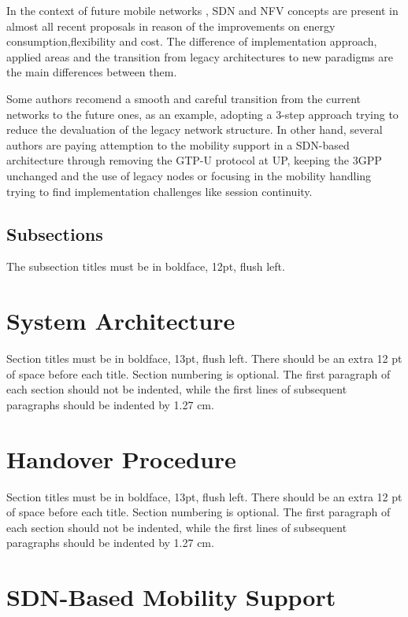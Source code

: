 \documentclass[12pt]{article}
\begin{document}
In the context of future mobile networks , SDN and NFV concepts are present in almost all recent proposals in reason of the improvements on energy consumption,flexibility and cost. The difference of implementation approach, applied areas and the transition from legacy architectures to new paradigms are the main differences between them.

Some authors recomend a smooth and careful transition from the current networks to the future ones, as an example, adopting a 3-step approach trying to reduce the devaluation of the legacy network structure. In other hand, several authors are paying attemption to the mobility support in a SDN-based architecture through removing the  GTP-U protocol at UP, keeping the 3GPP unchanged and the use of legacy nodes or focusing in the mobility handling trying to find implementation challenges like session continuity. 

\subsection{Subsections}

The subsection titles must be in boldface, 12pt, flush left.

\section{System Architecture}

Section titles must be in boldface, 13pt, flush left. There should be an extra
12 pt of space before each title. Section numbering is optional. The first
paragraph of each section should not be indented, while the first lines of
subsequent paragraphs should be indented by 1.27 cm.

\section{Handover Procedure}

Section titles must be in boldface, 13pt, flush left. There should be an extra
12 pt of space before each title. Section numbering is optional. The first
paragraph of each section should not be indented, while the first lines of
subsequent paragraphs should be indented by 1.27 cm.

\section{SDN-Based Mobility Support}
\end{document}
